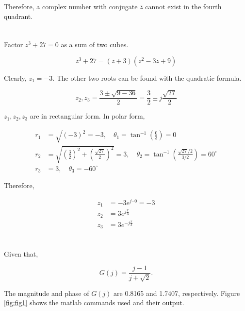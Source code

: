 \documentclass[12pt]{article}
\numberwithin{equation}{section}
\begin{document}
  Therefore, a complex number with conjugate $ \bar{z} $ cannot exist in the fourth quadrant.

  \section{}

  Factor $ z^3 + 27 = 0 $ as a sum of two cubes.

  \begin{equation}
    z^3 + 27 = (z + 3)(z ^2 - 3z + 9)
  \end{equation}

  Clearly, $ z_1 = -3. $ The other two roots can be found with the quadratic formula.

  \begin{equation}
    z_2, z_3 = \frac{3 \pm \sqrt{9 - 36}}{2} = \frac{3}{2} \pm j \frac{\sqrt{27}}{2}
  \end{equation}

  \newpage

  $ z_1, z_2, z_3 $ are in rectangular form. In polar form,

  \begin{align}
    r_1 &= \sqrt{(-3)^2} = -3, \quad \theta_1 = \tan^{-1} \left( \frac{0}{3} \right) = 0 \\
    r_2 &= \sqrt{ \left( \frac{3}{2} \right)^2 + \left( \frac{\sqrt{27}}{2} \right)^2 } = 3, \quad \theta_2 = \tan^{-1} \left( \frac{\sqrt{27}/2}{3/2} \right) = 60^{\circ} \\
    r_3 &= 3, \quad \theta_3 = -60^{\circ}
  \end{align}

  Therefore,

  \begin{align}
    z_1 &= -3e^{j \cdot 0} = -3 \\
    z_2 &= 3e^{j \frac{\pi}{3}} \\
    z_3 &= 3e^{-j \frac{\pi}{3}}
  \end{align}

  \newpage

  \section{}
  Given that,

  \[
      G(j) = \frac{j - 1}{j + \sqrt{2}}
    .\]

  The magnitude and phase of $ G(j) $ are 0.8165 and 1.7407, respectively. Figure \ref{fig:fig1} shows the matlab commands used and their output.
\end{document}
